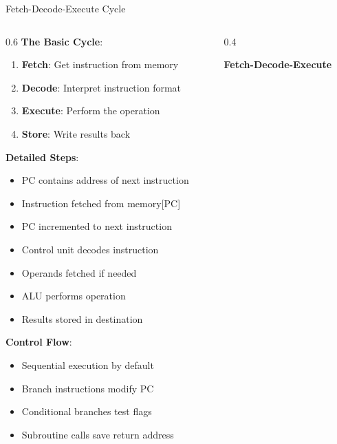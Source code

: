 \documentclass[aspectratio=169]{beamer}
\newcommand{\concept}[1]{\textbf{\color{darkblue}#1}}
\begin{document}
\begin{frame}{Fetch-Decode-Execute Cycle}
\begin{columns}
\begin{column}{0.6\textwidth}
\concept{The Basic Cycle}:
\begin{enumerate}
\item \textbf{Fetch}: Get instruction from memory
\item \textbf{Decode}: Interpret instruction format
\item \textbf{Execute}: Perform the operation
\item \textbf{Store}: Write results back
\end{enumerate}

\vspace{0.3cm}
\concept{Detailed Steps}:
\begin{itemize}
\item PC contains address of next instruction
\item Instruction fetched from memory[PC]
\item PC incremented to next instruction
\item Control unit decodes instruction
\item Operands fetched if needed
\item ALU performs operation
\item Results stored in destination
\end{itemize}

\vspace{0.3cm}
\concept{Control Flow}:
\begin{itemize}
\item Sequential execution by default
\item Branch instructions modify PC
\item Conditional branches test flags
\item Subroutine calls save return address
\end{itemize}
\end{column}
\begin{column}{0.4\textwidth}
\begin{center}
\textbf{Fetch-Decode-Execute}
\vspace{0.3cm}

\end{center}
\end{column}
\end{columns}
\end{frame}
\end{document}
